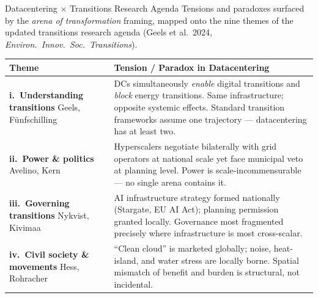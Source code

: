 \documentclass[aspectratio=169,11pt]{beamer}
\begin{document}
\begin{frame}{%
  \enspace Datacentering × Transitions Research Agenda}
\vspace{0.2em}
{\scriptsize Tensions and paradoxes surfaced by the \textit{arena of transformation} framing,
mapped onto the nine themes of the updated transitions research agenda
(Geels et al.\ 2024, \textit{Environ.\ Innov.\ Soc.\ Transitions}).}
\vspace{0.5em}

\begin{tabularx}{\linewidth}{@{}p{3.4cm}X@{}}
\toprule
\textbf{\scriptsize Theme} & \textbf{\scriptsize Tension / Paradox in Datacentering} \\
\midrule
\scriptsize\textbf{i.\ Understanding transitions}
\newline\textcolor{dcgray}{\tiny Geels, Fünfschilling}
&
\tiny DCs simultaneously \textit{enable} digital transitions and \textit{block} energy transitions. Same infrastructure; opposite systemic effects. Standard transition frameworks assume one trajectory — datacentering has at least two. \\[0.3em]

\scriptsize\textbf{ii.\ Power \& politics}
\newline\textcolor{dcgray}{\tiny Avelino, Kern}
&
\tiny Hyperscalers negotiate bilaterally with grid operators at national scale yet face municipal veto at planning level. Power is scale-incommensurable — no single arena contains it. \\[0.3em]

\scriptsize\textbf{iii.\ Governing transitions}
\newline\textcolor{dcgray}{\tiny Nykvist, Kivimaa}
&
\tiny AI infrastructure strategy formed nationally (Stargate, EU AI Act); planning permission granted locally. Governance most fragmented precisely where infrastructure is most cross-scalar. \\[0.3em]

\scriptsize\textbf{iv.\ Civil society \& movements}
\newline\textcolor{dcgray}{\tiny Hess, Rohracher}
&
\tiny ``Clean cloud'' is marketed globally; noise, heat-island, and water stress are locally borne. Spatial mismatch of benefit and burden is structural, not incidental. \\[0.3em]


\end{tabularx}
\end{frame}
\end{document}
